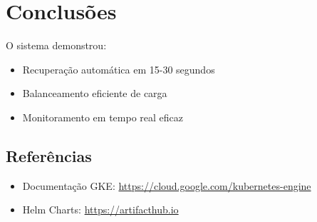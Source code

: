 \documentclass[12pt, a4paper]{article}
\begin{document}
\section{Conclusões}
O sistema demonstrou:
\begin{itemize}
    \item Recuperação automática em 15-30 segundos
    \item Balanceamento eficiente de carga
    \item Monitoramento em tempo real eficaz
\end{itemize}

\subsection*{Referências}
\begin{itemize}
    \item Documentação GKE: \url{https://cloud.google.com/kubernetes-engine}
    \item Helm Charts: \url{https://artifacthub.io}
\end{itemize}
\end{document}
